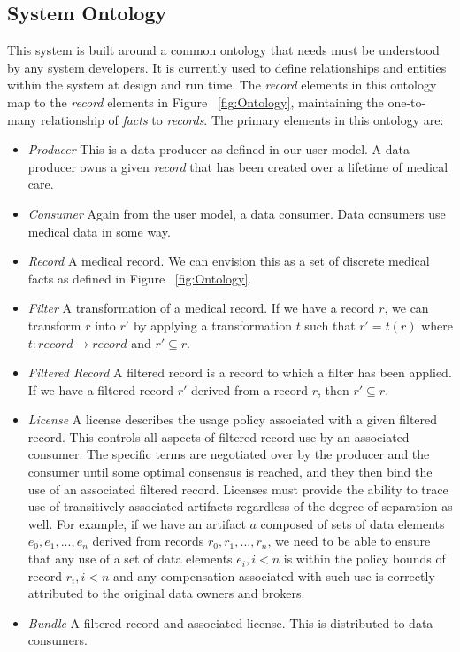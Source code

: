 \documentclass[10pt, conference, compsocconf]{IEEEtran}
\begin{document}
\subsection{System Ontology}
This system is built around a common ontology that needs must be understood by any system developers.  It is currently used to define relationships and entities within the system at design and run time.  The \textit{record} elements in this ontology map to the \textit{record} elements in Figure ~\ref{fig:Ontology}, maintaining the one-to-many relationship of \textit{facts} to \textit{records}.  The primary elements in this ontology are:

\begin{itemize}

\item \textit{Producer} This is a data producer as defined in our user model.  A data producer owns a given \textit{record} that has been created over a lifetime of medical care.

\item \textit{Consumer} Again from the user model, a data consumer.  Data consumers use medical data in some way.

\item \textit{Record} A medical record.  We can envision this as a set of discrete medical facts as defined in Figure ~\ref{fig:Ontology}.

\item \textit{Filter} A transformation of a medical record.  If we have a record $ r $, we can transform $ r $ into $ r' $ by applying a transformation $ t $ such that $ r' = t(r) $ where $ t : record \rightarrow record $ and $ r' \subseteq r $.

\item \textit{Filtered Record} A filtered record is a record to which a filter has been applied.  If we have a filtered record $ r' $ derived from a record $ r $, then $ r' \subseteq r $.

\item \textit{License} A license describes the usage policy associated with a given filtered record.  This controls all aspects of filtered record use by an associated consumer.  The specific terms are negotiated over by the producer and the consumer until some optimal consensus is reached, and they then bind the use of an associated filtered record.  Licenses must provide the ability to trace use of transitively associated artifacts regardless of the degree of separation as well.  For example, if we have an artifact $ a $ composed of sets of data elements $ e_{0}, e_{1}, ... , e_{n} $ derived from records $ r_{0}, r_{1}, ... , r_{n} $, we need to be able to ensure that any use of a set of data elements $ e_{i}, i < n $ is within the policy bounds of record $ r_{i}, i < n $ and any compensation associated with such use is correctly attributed to the original data owners and brokers.

\item \textit{Bundle} A filtered record and associated license.  This is distributed to data consumers.

\end{itemize}
\end{document}
